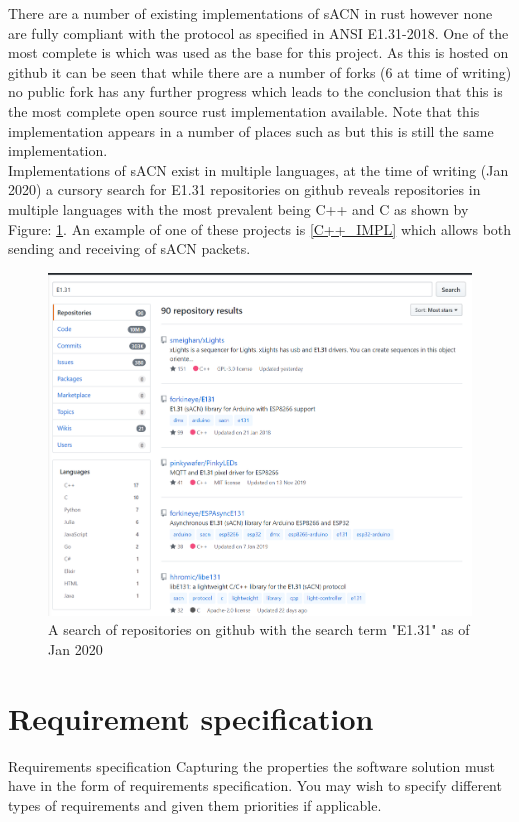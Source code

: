 \documentclass[11pt,a4paper,notitlepage]{report}
\begin{document}
	There are a number of existing implementations of sACN in rust however none are fully compliant with the protocol as specified in ANSI E1.31-2018. One of the most complete is \cite{ORIGNIAL_IMPL} which was used as the base for this project. As this is hosted on github it can be seen that while there are a number of forks (6 at time of writing) no public fork has any further progress which leads to the conclusion that this is the most complete open source rust implementation available. Note that this implementation appears in a number of places such as \cite{ORIGINAL_IMPL_RUST_DOC} but this is still the same implementation.\\
	
	Implementations of sACN exist in multiple languages, at the time of writing (Jan 2020) a cursory search for E1.31 repositories on github reveals repositories in multiple languages with the most prevalent being C++ and C as shown by Figure: \ref{E131_REPO_SEARCH}. An example of one of these projects is \ref{C++_IMPL} which allows both sending and receiving of sACN packets.
	
	\begin{figure}
		\label{E131_REPO_SEARCH}
		\includegraphics[width=\textwidth]{E131-Repo-Search}
		\caption{A search of repositories on github with the search term "E1.31" as of Jan 2020}
	\end{figure}

	\section{Requirement specification}
	Requirements
	specification
	Capturing the properties the software solution must
	have in the form of requirements specification. You
	may wish to specify different types of requirements and
	given them priorities if applicable.
	
\end{document}
